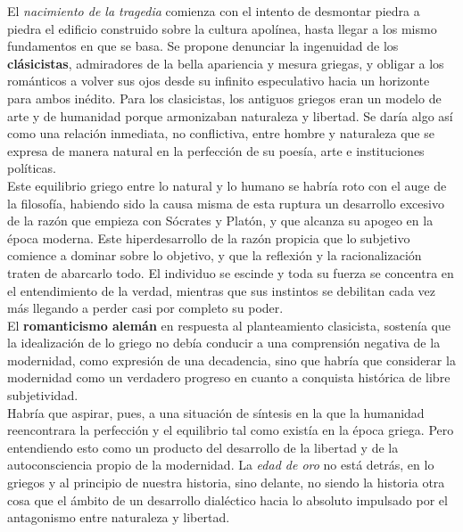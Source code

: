\documentclass[a4paper, 10pt, twocolumn, spanish]{article}
\begin{document}
El \emph{nacimiento de la tragedia} comienza con el intento de desmontar
piedra a piedra el edificio construido sobre la cultura apolínea,
hasta llegar a los mismo fundamentos en que se basa. Se propone
denunciar la ingenuidad de los \textbf{clásicistas}, admiradores de la bella
apariencia y mesura griegas, y obligar a los románticos a volver sus
ojos desde su infinito especulativo hacia un horizonte para ambos
inédito. Para los clasicistas, los antiguos griegos eran un modelo de
arte y de humanidad porque armonizaban naturaleza y libertad. Se daría
algo así como una relación inmediata, no conflictiva, entre hombre y
naturaleza que se expresa de manera natural en la perfección de su
poesía, arte e instituciones políticas.\\[0pt]
Este equilibrio griego entre lo natural y lo humano se habría roto con
el auge de la filosofía, habiendo sido la causa misma de esta ruptura
un desarrollo excesivo de la razón que empieza con Sócrates y Platón,
y que alcanza su apogeo en la época moderna. Este hiperdesarrollo de
la razón propicia que lo subjetivo comience a dominar sobre lo
objetivo, y que la reflexión y la racionalización traten de abarcarlo
todo. El individuo se escinde y toda su fuerza se concentra en el
entendimiento de la verdad, mientras que sus instintos se debilitan
cada vez más llegando a perder casi por completo su poder.\\[0pt]

El \textbf{romanticismo alemán} en respuesta al planteamiento clasicista,
sostenía que la idealización de lo griego no debía conducir a una
comprensión negativa de la modernidad, como expresión de una
decadencia, sino que habría que considerar la modernidad como un
verdadero progreso en cuanto a conquista histórica de libre
subjetividad.\\[0pt]
Habría que aspirar, pues, a una situación de síntesis en la que la
humanidad reencontrara la perfección y el equilibrio tal como existía
en la época griega. Pero entendiendo esto como un producto del
desarrollo de la libertad y de la autoconsciencia propio de la
modernidad. La \emph{edad de oro} no está detrás, en lo griegos y al
principio de nuestra historia, sino delante, no siendo la historia
otra cosa que el ámbito de un desarrollo dialéctico hacia lo absoluto
impulsado por el antagonismo entre naturaleza y libertad.\\[0pt]
\end{document}
